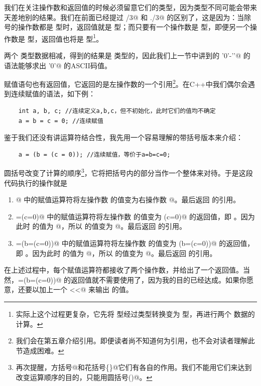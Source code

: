 我们在关注操作数和返回值的时候必须留意它们的类型，因为类型不同可能会带来天差地别的结果。我们在前面已经提过 /3@ 和 ./3@ 的区别了，这是因为：当除号的操作数都是 \lstinline@int@ 型时，返回值就是 \lstinline@int@ 型；而只要有一个操作数是 \lstinline@double@ 型，即便另一个操作数是 \lstinline@int@ 型，返回值也将是 \lstinline@double@ 型\footnote{实际上这个过程更复杂，它先将 \lstinline@int@ 型经过类型转换变为 \lstinline@double@ 型，再进行两个 \lstinline@double@ 数据的计算。}。\par
两个 \lstinline@char@ 类型数据相减，得到的结果是 \lstinline@int@ 类型的，因此我们上一节中讲到的 \lstinline@'0'-'\0'@ 的语法能够求出 \lstinline@'0'@ 的ASCII码值。\par
赋值语句也有返回值，它返回的是左操作数的一个引用\footnote{我们会在第五章介绍引用。即便读者尚不知道何为引用，也不会对读者理解此节造成困难。}。在C++中我们偶尔会遇到连续赋值的语法，如下例：
\begin{lstlisting}
    int a, b, c; //连续定义a,b,c，但不初始化，此时它们的值均不确定
    a = b = c = 0; //连续赋值
\end{lstlisting}
鉴于我们还没有讲运算符结合性，我先用一个容易理解的带括号版本来介绍：
\begin{lstlisting}
    a = (b = (c = 0)); //连续赋值，等价于a=b=c=0;
\end{lstlisting}
圆括号改变了计算的顺序\footnote{再次提醒，方括号\lstinline@[]@和花括号\lstinline@\{\}@它们有各自的作用。我们不能用它们来达到改变运算顺序的目的，只能用圆括号\lstinline@()@。}，它将把括号内的部分当作一个整体来对待。于是这段代码执行的操作就是
\begin{enumerate}
    \item {}@ 中的赋值运算符将左操作数 \lstinline@c@ 的值变为右操作数 @。最后返回 \lstinline@c@ 的引用。
    \item \lstinline@b=(c=0)@ 中的赋值运算符将左操作数 \lstinline@b@ 的值变为 \lstinline@(c=0)@ 的返回值，即 \lstinline@c@ 。因为此时 \lstinline@c@ 的值为 @，所以 \lstinline@b@ 的值变为 @。最后返回 \lstinline@b@ 的引用。
    \item \lstinline@a=(b=(c=0))@ 中的赋值运算符将左操作数 \lstinline@a@ 的值变为 \lstinline@(b=(c=0))@ 的返回值，即 \lstinline@b@。因为此时 \lstinline@b@ 的值为 @，所以 \lstinline@a@ 的值变为 @。最后返回 \lstinline@a@ 的引用。
\end{enumerate}
在上述过程中，每个赋值运算符都接收了两个操作数，并给出了一个返回值。当然，\lstinline@a=(b=(c=0))@ 的返回值就不需要使用了，因为我的目的已经达成。如果你愿意，还要以加上一个 \lstinline@cout<<@ 来输出 \lstinline@a@ 的值。
